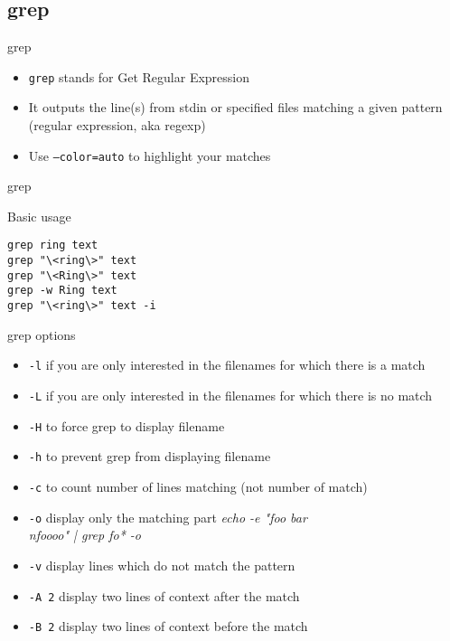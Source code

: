 \subsection{grep}
\begin{frame}[fragile]{grep}
\begin{itemize}
  \item \texttt{grep} stands for Get Regular Expression
  \pause
  \item It outputs the line(s) from stdin or specified files matching a given pattern (regular expression, aka regexp)
  \pause
  \item Use \texttt{--color=auto} to highlight your matches
\end{itemize}
\end{frame}

\begin{frame}[fragile]{grep}
  \begin{exampleblock}{Basic usage}
    \begin{lstlisting}[showstringspaces=false]
grep ring text
grep "\<ring\>" text
grep "\<Ring\>" text
grep -w Ring text
grep "\<ring\>" text -i
    \end{lstlisting}
  \end{exampleblock}
\end{frame}

\begin{frame}[fragile]{grep options}
\begin{itemize}
  \item \texttt{-l} if you are only interested in the filenames for which there is a match
  \pause \item \texttt{-L} if you are only interested in the filenames for which there is no match
  \pause \item \texttt{-H} to force grep to display filename
  \pause \item \texttt{-h} to prevent grep from displaying filename
  \pause \item \texttt{-c} to count number of lines matching (not number of match)
  \pause \item \texttt{-o} display only the matching part \emph{echo -e "foo bar\\nfoooo" | grep fo* -o}
  \pause \item \texttt{-v} display lines which do not match the pattern
  \pause \item \texttt{-A 2} display two lines of context after the match
  \pause \item \texttt{-B 2} display two lines of context before the match
\end{itemize}
\end{frame}
